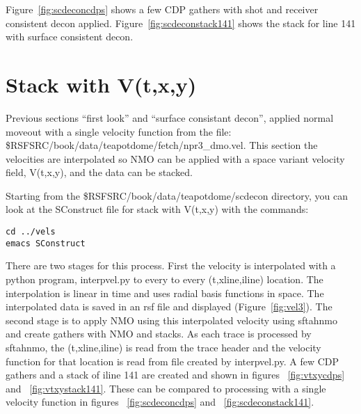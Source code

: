Figure~\ref{fig:scdeconcdps} shows a few CDP gathers with shot and receiver consistent decon applied.  Figure~\ref{fig:scdeconstack141} shows the stack for line 141 with surface consistent decon.



\section{Stack with V(t,x,y)}

Previous sections ``first look'' and  ``surface consistant decon'', applied normal moveout  with a single velocity function from the file:
\$RSFSRC/book/data/teapotdome/fetch/npr3\_dmo.vel.
This section the velocities are interpolated so NMO can be applied with a space variant velocity field, V(t,x,y), and the data can be stacked.

Starting from the \$RSFSRC/book/data/teapotdome/scdecon directory, you can look at the SConstruct file for stack with V(t,x,y) with the commands:
\begin{verbatim}  
cd ../vels
emacs SConstruct
\end{verbatim}  

There are two stages for this process.  First the velocity is interpolated with a python program, interpvel.py to every to every (t,xline,iline) location.  The interpolation is linear in time and uses radial basis functions in space.  The interpolated data is saved in an rsf file and displayed (Figure~\ref{fig:vel3}). The second stage is to apply NMO using this interpolated velocity using sftahnmo and create gathers with NMO and stacks.  As each trace is processed by sftahnmo, the (t,xline,iline) is read from the trace header and the velocity function for that location is read from file created by interpvel.py.  A few CDP gathers and a stack of iline 141 are created and shown in figures ~\ref{fig:vtxycdps} and ~\ref{fig:vtxystack141}.  These can be compared to processing with a single velocity function in figures ~\ref{fig:scdeconcdps} and ~\ref{fig:scdeconstack141}.


